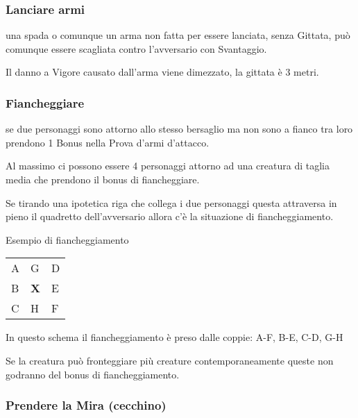 \documentclass[12pt,a4paper,twoside,openany]{book}
\begin{document}
\begin{multicols}{2}
\subsubsection{Lanciare armi} \label{lanciarearmi}

una spada o comunque un arma non fatta per essere lanciata, senza Gittata, può comunque essere scagliata contro l'avversario con Svantaggio.

Il danno a Vigore causato dall'arma viene dimezzato, la gittata è 3 metri.

\subsubsection{Fiancheggiare} \label{fiancheggiare}

se due personaggi sono attorno allo stesso bersaglio ma non sono a fianco tra loro prendono 1 Bonus nella Prova d'armi d'attacco.

Al massimo ci possono essere 4 personaggi attorno ad una creatura di taglia media che prendono il bonus di fiancheggiare.

Se tirando una ipotetica riga che collega i due personaggi questa attraversa in pieno il quadretto dell'avversario allora c'è la situazione di fiancheggiamento.

\bigskip

Esempio di fiancheggiamento

\medskip

\begin{tabularx}{0.45\textwidth}{lll}
\toprule
A &  G &  D\\
B & \textbf{X}  &  E\\
C &  H &  F\\
\end{tabularx}

\bigskip

In questo schema il fiancheggiamento è preso dalle coppie: A-F, B-E, C-D, G-H

\bigskip

Se la creatura può fronteggiare più creature contemporaneamente queste non godranno del bonus di fiancheggiamento.


\subsubsection{Prendere la Mira (cecchino)} \label{cecchino}


\end{multicols}
\end{document}
